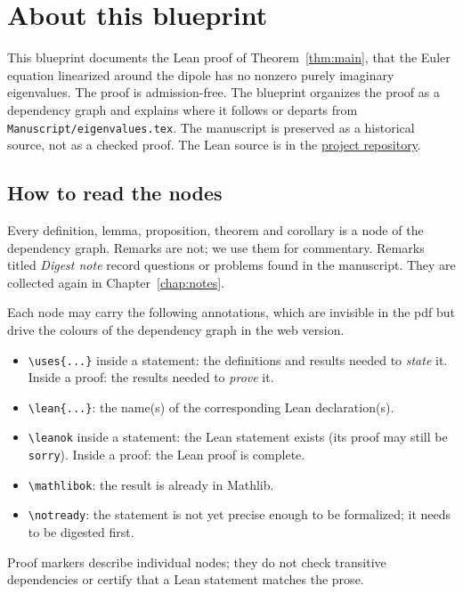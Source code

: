 \chapter{About this blueprint}
\label{chap:intro}

This blueprint documents the Lean proof of Theorem~\ref{thm:main}, that the
Euler equation linearized around the dipole has no nonzero purely imaginary
eigenvalues. The proof is admission-free. The blueprint organizes the proof
as a dependency graph and explains where it follows or departs from
\texttt{Manuscript/eigenvalues.tex}. The manuscript is preserved as a
historical source, not as a checked proof. The Lean source is in the
\href{https://github.com/Joel-Dahne/EulerDipoleEigenvalues}{project repository}.

\section*{How to read the nodes}

Every definition, lemma, proposition, theorem and corollary is a node of the
dependency graph. Remarks are not; we use them for commentary. Remarks titled
\emph{Digest note} record questions or problems found in the manuscript. They
are collected again in Chapter~\ref{chap:notes}.

Each node may carry the following annotations, which are invisible in the
pdf but drive the colours of the dependency graph in the web version.
\begin{itemize}
  \item \verb|\uses{...}| inside a statement: the definitions and results
        needed to \emph{state} it. Inside a proof: the results needed to
        \emph{prove} it.
  \item \verb|\lean{...}|: the name(s) of the corresponding Lean declaration(s).
  \item \verb|\leanok| inside a statement: the Lean statement exists (its
        proof may still be \texttt{sorry}). Inside a proof: the Lean proof is
        complete.
  \item \verb|\mathlibok|: the result is already in Mathlib.
  \item \verb|\notready|: the statement is not yet precise enough to be
        formalized; it needs to be digested first.
\end{itemize}
Proof markers describe individual nodes; they do not check transitive
dependencies or certify that a Lean statement matches the prose.

